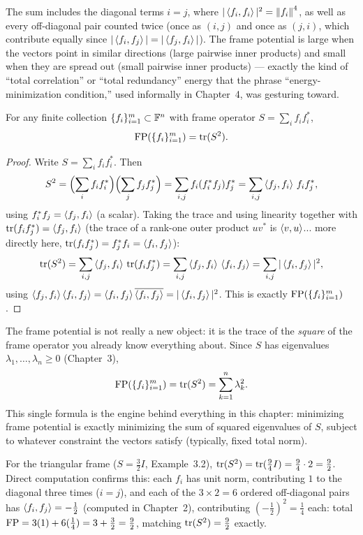 The sum includes the diagonal terms $i=j$, where
$|\left\langle f_i, f_i \right\rangle|^2=\left\| f_i \right\|^4$, as well as every off-diagonal pair
counted twice (once as $(i,j)$ and once as $(j,i)$, which contribute
equally since $|\left\langle f_i, f_j \right\rangle|=|\left\langle f_j, f_i \right\rangle|$). The frame
potential is large when the vectors point in similar directions
(large pairwise inner products) and small when they are spread out
(small pairwise inner products) --- exactly the kind of ``total
correlation'' or ``total redundancy'' energy that the phrase
``energy-minimization condition,'' used informally in Chapter~4, was
gesturing toward.

\begin{proposition}
\label{prop:fp-is-trace-S2}
For any finite collection $\{f_i\}_{i=1}^m\subset\mathbb{F}^n$ with frame
operator $S=\sum_if_if_i^*$,
\[
  \operatorname{FP}(\{f_i\}_{i=1}^m) = \operatorname{tr}(S^2).
\]
\end{proposition}

\begin{proof}
Write $S=\sum_if_if_i^*$. Then
\[
  S^2 = \Bigl(\sum_if_if_i^*\Bigr)\Bigl(\sum_jf_jf_j^*\Bigr)
      = \sum_{i,j} f_i(f_i^*f_j)f_j^* = \sum_{i,j}\left\langle f_j, f_i \right\rangle\,f_if_j^*,
\]
using $f_i^*f_j=\left\langle f_j, f_i \right\rangle$ (a scalar). Taking the trace and using
linearity together with $\operatorname{tr}(f_if_j^*)=\left\langle f_j, f_i \right\rangle$ (the trace of a
rank-one outer product $uv^*$ is $\left\langle v, u \right\rangle$... more directly here,
$\operatorname{tr}(f_if_j^*)=f_j^*f_i=\left\langle f_i, f_j \right\rangle$):
\[
  \operatorname{tr}(S^2) = \sum_{i,j}\left\langle f_j, f_i \right\rangle\,\operatorname{tr}(f_if_j^*)
           = \sum_{i,j}\left\langle f_j, f_i \right\rangle\,\left\langle f_i, f_j \right\rangle
           = \sum_{i,j}|\left\langle f_i, f_j \right\rangle|^2,
\]
using $\left\langle f_j, f_i \right\rangle\left\langle f_i, f_j \right\rangle=\left\langle f_i, f_j \right\rangle\overline{\left\langle f_i, f_j \right\rangle}=|\left\langle f_i, f_j \right\rangle|^2$.
This is exactly $\operatorname{FP}(\{f_i\}_{i=1}^m)$.
\end{proof}

\begin{keyidea}
The frame potential is not really a new object: it is the trace of the
\emph{square} of the frame operator you already know everything about.
Since $S$ has eigenvalues $\lambda_1,\ldots,\lambda_n\ge0$ (Chapter~3),
\[
  \operatorname{FP}(\{f_i\}_{i=1}^m)=\operatorname{tr}(S^2)=\sum_{k=1}^n\lambda_k^2.
\]
This single formula is the engine behind everything in this chapter:
minimizing frame potential is exactly minimizing the sum of squared
eigenvalues of $S$, subject to whatever constraint the vectors satisfy
(typically, fixed total norm).
\end{keyidea}

\begin{examplebox}[title={Example 8.1: Frame potential of the triangular frame}]
\label{ex:fp-triangle}
For the triangular frame ($S=\tfrac32I$, Example~3.2), $\operatorname{tr}(S^2)=
\operatorname{tr}(\tfrac94I)=\tfrac94\cdot2=\tfrac92$. Direct computation confirms this:
each $f_i$ has unit norm, contributing $1$ to the diagonal three times
($i=j$), and each of the $3\times2=6$ ordered off-diagonal pairs has
$\left\langle f_i, f_j \right\rangle=-\tfrac12$ (computed in Chapter~2), contributing
$(-\tfrac12)^2=\tfrac14$ each: total $\operatorname{FP} = 3(1) + 6(\tfrac14) =
3+\tfrac32=\tfrac92$, matching $\operatorname{tr}(S^2)=\tfrac92$ exactly.
\end{examplebox}

